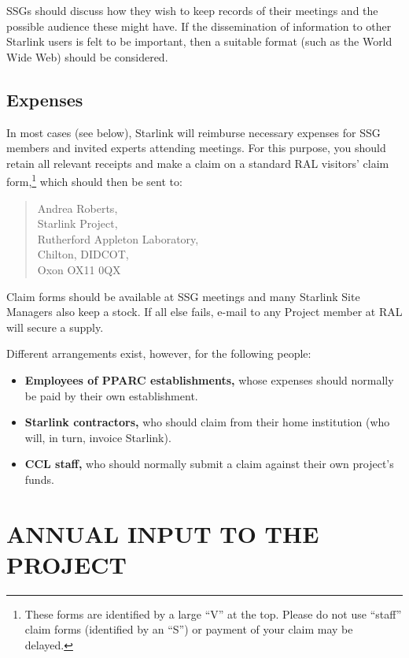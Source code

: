 \documentclass[twoside,11pt]{article}
\newcommand{\htmladdnormallink}[2]{#1}
\newcommand{\xlabel}[1]{}
\newcommand{\staffref}[1]{\htmladdnormallink{#1}{http://www.starlink.ac.uk/pro.html}}
\newcommand{\ralref}[1]{\htmladdnormallink{#1}{http://www.clrc.ac.uk/ral/index.html}}
\newcommand{\cclref}[1]{\htmladdnormallink{#1}{http://www.clrc.ac.uk/}}
\newcommand{\qt}[1]{``#1''}
\newcommand{\qt}[1]{{\tt{"}}#1{\tt{"}}}
\begin{document}
SSGs should discuss how they wish to keep records of their meetings
and the possible audience these might have. If the dissemination of
information to other Starlink users is felt to be important, then a
suitable format (such as the World Wide Web) should be considered.

\subsection{Expenses}

In most cases (see below), Starlink will reimburse necessary expenses
for SSG members and invited experts attending meetings. For this
purpose, you should retain all relevant receipts and make a claim on a
standard \ralref{RAL} visitors' claim form,\footnote{These forms are
identified by a large \qt{V} at the top. Please do not use \qt{staff}
claim forms (identified by an \qt{S}) or payment of your claim may be
delayed.}  which should then be sent to:

\begin{quote}
Andrea Roberts,\\
Starlink Project,\\
Rutherford Appleton Laboratory,\\
Chilton, DIDCOT,\\
Oxon OX11 0QX
\end{quote}

Claim forms should be available at SSG meetings and many Starlink Site
Managers also keep a stock. If all else fails, e-mail to any
\staffref{Project member} at RAL will secure a supply.

Different arrangements exist, however, for the following people:

\begin{itemize}

\item {\bf Employees of PPARC establishments,} whose expenses should
normally be paid by their own establishment.

\item {\bf Starlink contractors,} who should claim from their home
institution (who will, in turn, invoice Starlink).

\item {\bf \cclref{CCL} staff,} who should normally submit a claim
against their own project's funds.

\end{itemize}

\section{\xlabel{annual_input}ANNUAL INPUT TO THE PROJECT}
\end{document}
